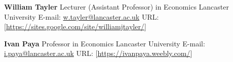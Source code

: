 \documentclass[10pt,]{article}
\begin{document}
              \textbf{William Tayler} \newline  Lecturer (Assistant Professor) in
              Economics \newline  Lancaster University \newline  E-mail:
              \url{w.tayler@lancaster.ac.uk} \newline  URL:
              {[}\url{https://sites.google.com/site/williamjtayler/}{]}
              
              \textbf{Ivan Paya} \newline  Professor in Economics \newline  Lancaster
              University \newline  E-mail: \url{i.paya@lancaster.ac.uk} \newline  URL:
              {[}\url{https://ivanpaya.weebly.com/}{]}
              
                
                                                                
\end{document}
